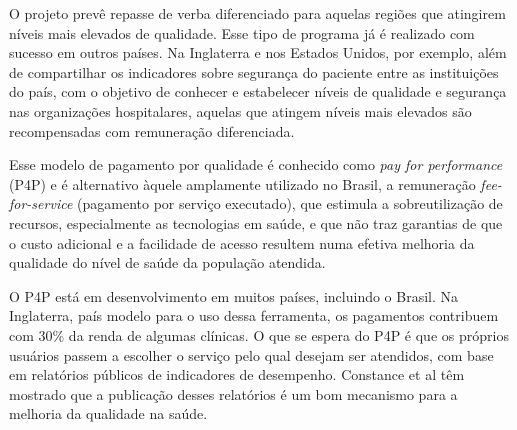 \documentclass{article}
\begin{document}
O projeto prevê repasse de verba diferenciado para aquelas regiões que atingirem níveis
        mais elevados de qualidade. Esse tipo de programa já é realizado com sucesso em outros
        países. Na Inglaterra e nos Estados Unidos, por exemplo, além de compartilhar os indicadores
        sobre segurança do paciente entre as instituições do país, com o objetivo de conhecer e
        estabelecer níveis de qualidade e segurança nas organizações hospitalares, aquelas que
        atingem níveis mais elevados são recompensadas com remuneração diferenciada. %


Esse modelo de pagamento por qualidade é conhecido como %
\textit{pay for
          performance}
 (P4P) %
 e é alternativo àquele amplamente utilizado no Brasil, a remuneração
\textit{fee-for-service}
 (pagamento por serviço executado), que estimula a
        sobreutilização de recursos, especialmente as tecnologias em saúde, e que não traz garantias
        de que o custo adicional e a facilidade de acesso resultem numa efetiva melhoria da
        qualidade do nível de saúde da população atendida. %


O P4P está em desenvolvimento em muitos países, incluindo o Brasil. Na Inglaterra, país
        modelo para o uso dessa ferramenta, os pagamentos contribuem com 30\% da renda de algumas
        clínicas. %
 O que se espera do P4P é que os próprios usuários passem a escolher o serviço pelo
        qual desejam ser atendidos, com base em relatórios públicos de indicadores de desempenho.
        Constance et al %
 têm mostrado que a publicação desses relatórios é um bom mecanismo para a melhoria
        da qualidade na saúde.
\end{document}
